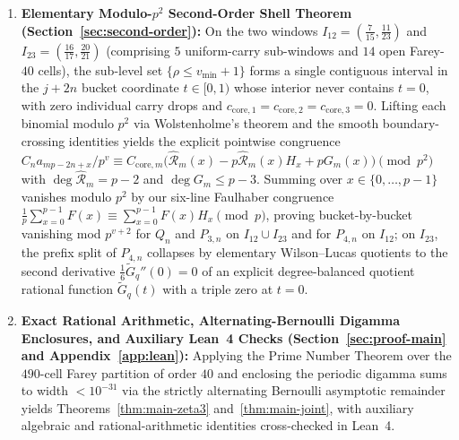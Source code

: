 \documentclass[11pt,reqno]{amsart}
\theoremstyle{definition}
\theoremstyle{remark}
\newcommand{\FF}{\mathbb{F}}
\newcommand{\ord}{\operatorname{ord}}
\begin{document}
\begin{enumerate}
  \[
    \Delta(u) := 2 - 3\lfloor 13u \rfloor + \lfloor 20u \rfloor + \lfloor 19u \rfloor
  \]
  is identically $1$-periodic because $3 \cdot 13 = 20 + 19$. Forming the canonical Wilson--Lucas rational function $\mathcal{R}_m(x) \in \FF_p(x)$ on each $p$-bucket $j = mp - t_0 + x$, its order at every $x \in \FF_p$ is $\ord_x(\mathcal{R}_m) = \rho(x_0, x/p) - v_{\min}(x_0) \ge 0$. Hence $\mathcal{R}_m(x)$ has no poles and is a polynomial in $\FF_p[x]$ of exact degree $(\Delta - v_{\min})p - 2 = p - 2 < p - 1$. Because $j + 2n$ and $j + 4n$ are already the lower endpoints of the second and third numerator binomials, no harmonic-sum jump cuts the open arc $\mathcal{A}(x_0)$; every double-pole and simple-pole wing bucket of $Q_n$, $P_{3,n}$, and $P_{4,n}$ reduces to a constant scalar multiple of $\mathcal{R}_m(x)$ and vanishes individually modulo $p$ (already proving $\mu(\zeta(3)) < 5.3193$ and $\mu(A\zeta(3)+B\zeta(4)) < 119.7$).
  \item \textbf{Elementary Modulo-$p^2$ Second-Order Shell Theorem (Section~\ref{sec:second-order}):} On the two windows $I_{12} = (\frac{7}{15}, \frac{11}{23})$ and $I_{23} = (\frac{16}{17}, \frac{20}{21})$ (comprising $5$ uniform-carry sub-windows and $14$ open Farey-$40$ cells), the sub-level set $\{\rho \le v_{\min} + 1\}$ forms a single contiguous interval in the $j + 2n$ bucket coordinate $t \in [0, 1)$ whose interior never contains $t = 0$, with zero individual carry drops and $c_{\mathrm{core}, 1} = c_{\mathrm{core}, 2} = c_{\mathrm{core}, 3} = 0$. Lifting each binomial modulo $p^2$ via Wolstenholme's theorem and the smooth boundary-crossing identities yields the explicit pointwise congruence $C_n a_{mp-2n+x}/p^v \equiv C_{\mathrm{core},m}\bigl(\widehat{\mathcal{R}}_m(x) - p\widehat{\mathcal{R}}_m(x)H_x + p G_m(x)\bigr) \pmod{p^2}$ with $\deg \widehat{\mathcal{R}}_m = p - 2$ and $\deg G_m \le p - 3$. Summing over $x \in \{0, \dots, p-1\}$ vanishes modulo $p^2$ by our six-line Faulhaber congruence $\frac{1}{p}\sum_{x=0}^{p-1} F(x) \equiv \sum_{x=0}^{p-1} F(x) H_x \pmod p$, proving bucket-by-bucket vanishing mod $p^{v+2}$ for $Q_n$ and $P_{3,n}$ on $I_{12} \cup I_{23}$ and for $P_{4,n}$ on $I_{12}$; on $I_{23}$, the prefix split of $P_{4,n}$ collapses by elementary Wilson--Lucas quotients to the second derivative $\frac{1}{6}\widetilde{G}_q''(0) = 0$ of an explicit degree-balanced quotient rational function $\widetilde{G}_q(t)$ with a triple zero at $t = 0$.
  \item \textbf{Exact Rational Arithmetic, Alternating-Bernoulli Digamma Enclosures, and Auxiliary Lean~4 Checks (Section~\ref{sec:proof-main} and Appendix~\ref{app:lean}):} Applying the Prime Number Theorem over the $490$-cell Farey partition of order $40$ and enclosing the periodic digamma sums to width $< 10^{-31}$ via the strictly alternating Bernoulli asymptotic remainder yields Theorems~\ref{thm:main-zeta3} and~\ref{thm:main-joint}, with auxiliary algebraic and rational-arithmetic identities cross-checked in Lean~4.
\end{enumerate}
\end{document}
